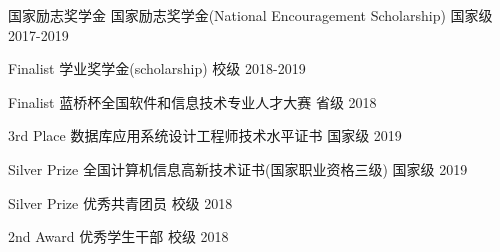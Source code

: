 



\begin{cvhonors}

  \cvhonor
    {国家励志奖学金} %
    {国家励志奖学金(National Encouragement Scholarship)} %
    {国家级} %
    {2017-2019} %

  \cvhonor
    {Finalist} %
    {学业奖学金(scholarship)} %
    {校级} %
    {2018-2019} %

  \cvhonor
    {Finalist} %
    {蓝桥杯全国软件和信息技术专业人才大赛} %
    {省级} %
    {2018} %

\end{cvhonors}




\begin{cvhonors}

  \cvhonor
    {3rd Place} %
    {数据库应用系统设计工程师技术水平证书} %
    {国家级} %
    {2019} %

  \cvhonor
    {Silver Prize} %
    {全国计算机信息高新技术证书(国家职业资格三级)} %
    {国家级} %
    {2019} %

  \cvhonor
    {Silver Prize} %
    {优秀共青团员} %
    {校级} %
    {2018} %

  \cvhonor
    {2nd Award} %
    {优秀学生干部} %
    {校级} %
    {2018} %
    
\end{cvhonors}
